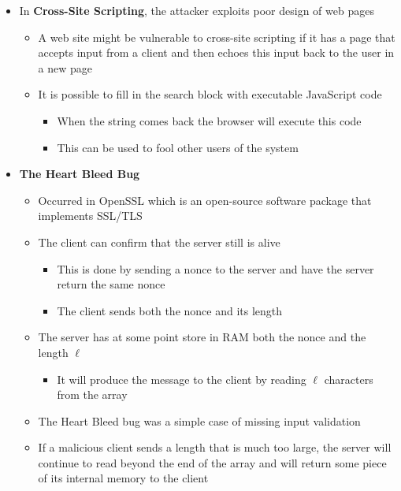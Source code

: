 \documentclass[11pt]{article}
\begin{document}
\begin{itemize}
\item In \textbf{Cross-Site Scripting}, the attacker exploits poor design of web pages
\begin{itemize}
\item A web site might be vulnerable to cross-site scripting if it has a page that accepts input from a client and then echoes this input back to the user in a new page
\item It is possible to fill in the search block with executable JavaScript code
\begin{itemize}
\item When the string comes back the browser will execute this code
\item This can be used to fool other users of the system
\end{itemize}
\end{itemize}

\item \textbf{The Heart Bleed Bug}
\begin{itemize}
\item Occurred in OpenSSL which is an open-source software package that implements SSL/TLS
\item The client can confirm that the server still is alive
\begin{itemize}
\item This is done by sending a nonce to the server and have the server return the same nonce
\item The client sends both the nonce and its length
\end{itemize}
\item The server has at some point store in RAM both the nonce and the length \(\ell\)
\begin{itemize}
\item It will produce the message to the client by reading \(\ell\) characters from the array
\end{itemize}
\item The Heart Bleed bug was a simple case of missing input validation
\item If a malicious client sends a length that is much too large, the server will continue to read beyond the end of the array and will return some piece of its internal memory to the client
\end{itemize}
\end{itemize}
\end{document}
